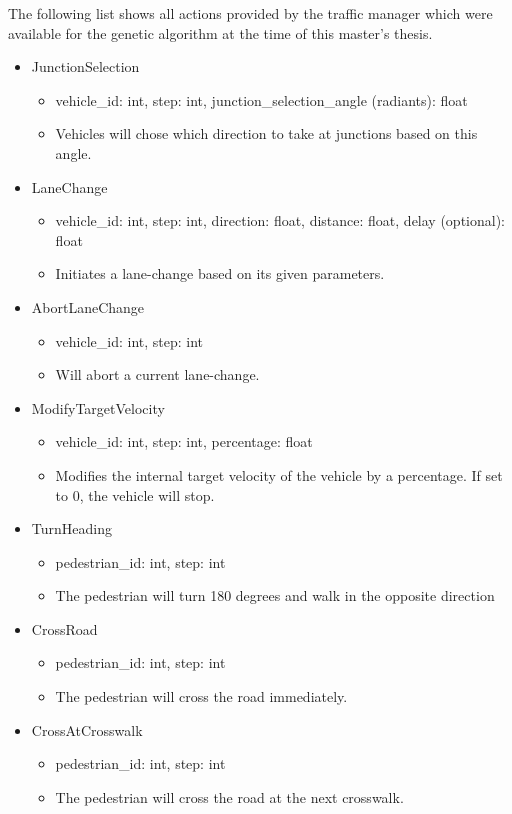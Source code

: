 The following list shows all actions provided by the traffic manager which were available for the genetic algorithm at the time of this master's thesis.
\begin{itemize}
	\item JunctionSelection
	\begin{itemize}
		\item vehicle\_id: int, step: int, junction\_selection\_angle (radiants): float
		\item Vehicles will chose which direction to take at junctions based on this angle.
	\end{itemize}
	\item LaneChange
	\begin{itemize}
		\item vehicle\_id: int, step: int, direction: float, distance: float, delay (optional): float
		\item Initiates a lane-change based on its given parameters.
	\end{itemize}
	\item AbortLaneChange
	\begin{itemize}
		\item vehicle\_id: int, step: int
		\item Will abort a current lane-change.
	\end{itemize}
	\item ModifyTargetVelocity
	\begin{itemize}
		\item vehicle\_id: int, step: int, percentage: float
		\item Modifies the internal target velocity of the vehicle by a percentage. If set to 0, the vehicle will stop.
	\end{itemize}
	\item TurnHeading
	\begin{itemize}
		\item pedestrian\_id: int, step: int
		\item The pedestrian will turn 180 degrees and walk in the opposite direction
	\end{itemize}
	\item CrossRoad
	\begin{itemize}
		\item pedestrian\_id: int, step: int
		\item The pedestrian will cross the road immediately.
	\end{itemize}
	\item CrossAtCrosswalk
	\begin{itemize}
		\item pedestrian\_id: int, step: int
		\item The pedestrian will cross the road at the next crosswalk.
	\end{itemize}
\end{itemize}

